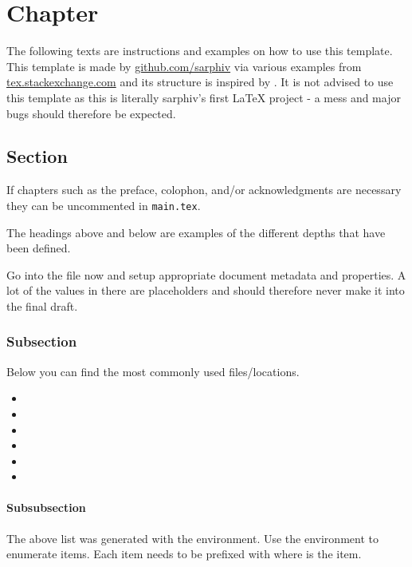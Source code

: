 \chapter{Chapter}
The following texts are instructions and examples on how to use this template.
This template is made by \href{https://github.com/sarphiv/}{github.com/sarphiv} via various examples from \href{https://tex.stackexchange.com}{tex.stackexchange.com}
and its structure is inspired by .
It is not advised to use this template as this is literally sarphiv's first LaTeX project - a mess and major bugs should therefore be expected.

\section{Section}
If chapters such as the preface, colophon, and/or acknowledgments are necessary
they can be uncommented in \lstinline|main.tex|.

The headings above and below are examples of the different depths that have been defined.

Go into the  file now and setup appropriate document metadata and properties.
A lot of the values in there are placeholders and should therefore never make it into the final draft.

\subsection{Subsection}
Below you can find the most commonly used files/locations.
\begin{itemize}
    \item {}
    \item {}
    \item {}
    \item {}
    \item {}
    \item {}
\end{itemize}

\subsubsection{Subsubsection}
The above list was generated with the  environment.
Use the  environment to enumerate items.
Each item needs to be prefixed with 
where  is the item.

